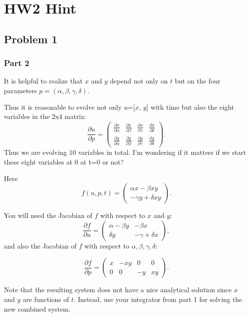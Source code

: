 \documentclass{article}
\begin{document}
\section{HW2 Hint}
\subsection{Problem 1}
\subsubsection{Part 2}

It is helpful to realize that $x$ and $y$ depend not only on $t$ but on the four parameters $p=(\alpha,\beta,\gamma,\delta).$

Thus it is reasonable to evolve not only $u$=[$x$, $y$] with time but also the
eight variables in the 2x4 matrix:
$$ 
\frac{\partial{u}}{\partial p}=
\begin{pmatrix}
\frac{\partial x}{\partial \alpha} &
\frac{\partial x}{\partial \beta} &
\frac{\partial x}{\partial \gamma} &
\frac{\partial x}{\partial \delta} \\
\frac{\partial y}{\partial \alpha} &
\frac{\partial y}{\partial \beta} &
\frac{\partial y}{\partial \gamma} &
\frac{\partial y}{\partial \delta}
\end{pmatrix}.$$
Thus we are evolving 10 variables in
total.  
I'm wondering if it matters
if we start these eight variables
at 0 at t=0 or not?

Here
$$f(u,p,t) =
\begin{pmatrix}
\alpha x - \beta x y \\
-\gamma y + \delta x y
\end{pmatrix}.
$$

You will need the Jacobian
of $f$ with respect to $x$ and $y$:
$$\frac{\partial f}{\partial u}
=
\begin{pmatrix}
\alpha-\beta y & - \beta x \\
\delta y & -\gamma + \delta x
\end{pmatrix},
$$
and also the Jacobian of $f$ with
respect to $\alpha,\beta,\gamma,\delta$:

$$
\frac{\partial f}{\partial p}=
\begin{pmatrix}
x & -xy & 0 & 0 \\
0 & 0 & -y & xy
\end{pmatrix}.
$$

Note that the resulting system does not have a nice analytical solution since $x$ and $y$ are functions of
$t$. Instead, use your integrator from part 1 for solving the new combined system.
\end{document}

